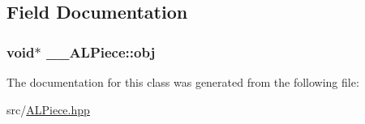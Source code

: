 \subsection{\-Field \-Documentation}
\hypertarget{class____ALPiece_a36db65740f7c33d3ea839b87f3b92d3a}{
\subsubsection[{obj}]{\setlength{\rightskip}{0pt plus 5cm}void$\ast$ {\bf \-\_\-\-\_\-\-A\-L\-Piece\-::obj}}}\label{class____ALPiece_a36db65740f7c33d3ea839b87f3b92d3a}


\-The documentation for this class was generated from the following file\-:\begin{DoxyCompactItemize}
\item 
src/\hyperlink{ALPiece_8hpp}{\-A\-L\-Piece.\-hpp}\end{DoxyCompactItemize}
